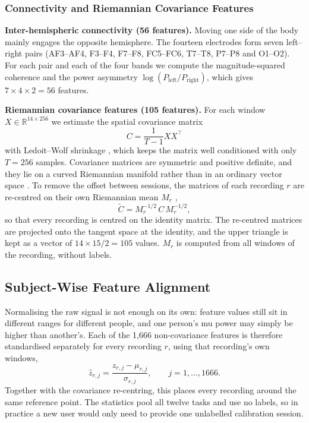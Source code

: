 \documentclass[pdflatex,sn-mathphys-num]{sn-jnl}%
\theoremstyle{thmstyleone}%
\theoremstyle{thmstyletwo}%
\theoremstyle{thmstylethree}%
\begin{document}
\subsubsection{Connectivity and Riemannian Covariance Features}\label{subsec:conn}

\textbf{Inter-hemispheric connectivity (56 features).} Moving one side of the body mainly engages the opposite hemisphere. The fourteen electrodes form seven left--right pairs (AF3--AF4, F3--F4, F7--F8, FC5--FC6, T7--T8, P7--P8 and O1--O2). For each pair and each of the four bands we compute the magnitude-squared coherence and the power asymmetry $\log(P_{\mathrm{left}}/P_{\mathrm{right}})$, which gives $7 \times 4 \times 2 = 56$ features.

\textbf{Riemannian covariance features (105 features).} For each window $X \in \mathbb{R}^{14 \times 256}$ we estimate the spatial covariance matrix
\begin{equation}
C = \frac{1}{T - 1} X X^{\top}
\end{equation}
with Ledoit--Wolf shrinkage \citep{LedoitWolf2004}, which keeps the matrix well conditioned with only $T = 256$ samples. Covariance matrices are symmetric and positive definite, and they lie on a curved Riemannian manifold rather than in an ordinary vector space \citep{Barachant2012}. To remove the offset between sessions, the matrices of each recording $r$ are re-centred on their own Riemannian mean $M_r$ \citep{Zanini2018},
\begin{equation}
\tilde{C} = M_r^{-1/2}\, C\, M_r^{-1/2},
\end{equation}
so that every recording is centred on the identity matrix. The re-centred matrices are projected onto the tangent space at the identity, and the upper triangle is kept as a vector of $14 \times 15 / 2 = 105$ values. $M_r$ is computed from all windows of the recording, without labels.

\subsection{Subject-Wise Feature Alignment}\label{subsec:align}

Normalising the raw signal is not enough on its own: feature values still sit in different ranges for different people, and one person's mu power may simply be higher than another's. Each of the 1,666 non-covariance features is therefore standardised separately for every recording $r$, using that recording's own windows,
\begin{equation}
\hat{z}_{r,j} = \frac{z_{r,j} - \mu_{r,j}}{\sigma_{r,j}}, \qquad j = 1, \dots, 1666 .
\end{equation}
Together with the covariance re-centring, this places every recording around the same reference point. The statistics pool all twelve tasks and use no labels, so in practice a new user would only need to provide one unlabelled calibration session.
\end{document}
